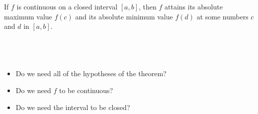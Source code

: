 \begin{frame}[t]
\begin{theorem}
If \alert<3-4>{$f$ is continuous} on a \alert<5-6>{closed interval $[a,b]$}, then $f$ attains its absolute maximum value $f(c)$ and its absolute minimum value $f(d)$ at some numbers $c$ and $d$ in $[a,b]$.
\end{theorem}
\begin{columns}[c]
\ %
\ %
\end{columns}
\begin{itemize}
\item  Do we need all of the hypotheses of the theorem?
\item<2-| alert@3-4>  Do we need $f$ to be continuous?  
\item<2-| alert@5-6>  Do we need the interval to be closed?  
\end{itemize}
\end{frame}
